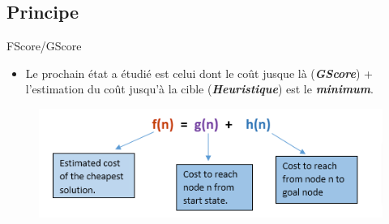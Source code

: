 \documentclass{beamer}
\begin{document}
    \subsection{Principe}
    \begin{frame}{FScore/GScore}
        \begin{itemize}
            \item Le prochain état a étudié est celui dont le coût jusque là (\textbf{\textit{GScore}}) + l'estimation
            du coût jusqu'à la cible (\textbf{\textit{Heuristique}}) est le \textbf{\textit{minimum}}.
        \end{itemize}
        \begin{figure}
            \includegraphics[scale=0.68]{Images/fn.png}
        \end{figure}
    \end{frame}
\end{document}
